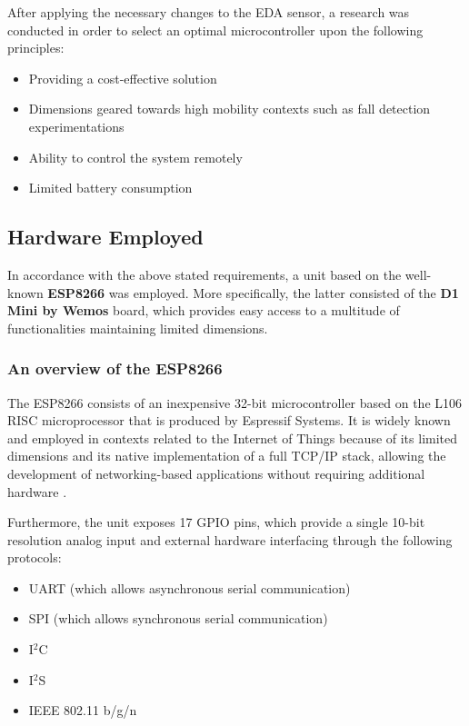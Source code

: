 After applying the necessary changes to the EDA sensor, a research was conducted in order to select an optimal microcontroller upon the following principles: 

\begin{itemize}
    \item Providing a cost-effective solution
    \item Dimensions geared towards high mobility contexts such as fall detection experimentations
    \item Ability to control the system remotely
    \item Limited battery consumption
\end{itemize}

\subsection{Hardware Employed}\label{sec:hardware-employed}

In accordance with the above stated requirements, a unit based on the well-known \textbf{ESP8266} was employed. More specifically, the latter consisted of the \textbf{D1 Mini by Wemos} board, which provides easy access to a multitude of functionalities maintaining limited dimensions.

\subsubsection{An overview of the ESP8266}\label{sec:esp8266}

The ESP8266 consists of an inexpensive 32-bit microcontroller based on the L106 RISC microprocessor that is produced by Espressif Systems. It is widely known and employed in contexts related to the Internet of Things because of its limited dimensions and its native implementation of a full TCP/IP stack, allowing the development of networking-based applications without requiring additional hardware \cite{esp8266}.

Furthermore, the unit exposes 17 GPIO pins, which provide a single 10-bit resolution analog input and external hardware interfacing through the following protocols:

\begin{itemize}
    \item UART (which allows asynchronous serial communication)
    \item SPI (which allows synchronous serial communication)
    \item I$^2$C %
    \item I$^2$S %
    \item IEEE 802.11 b/g/n
\end{itemize}

